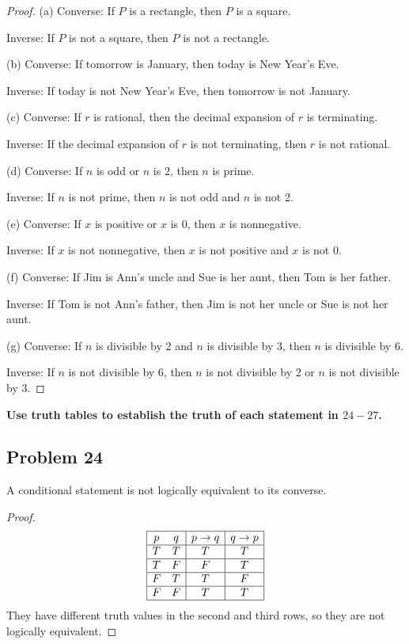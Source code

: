 \documentclass[14pt]{extarticle}
\begin{document}
\begin{proof}
(a) Converse: If $P$ is a rectangle, then $P$ is a square.

Inverse: If $P$ is not a square, then $P$ is not a rectangle.

(b) Converse: If tomorrow is January, then today is New Year’s Eve.

Inverse: If today is not New Year’s Eve, then tomorrow is not January.

(c) Converse: If $r$ is rational, then the decimal expansion of $r$ is terminating.

Inverse: If the decimal expansion of $r$ is not terminating, then $r$ is not rational.

(d) Converse: If $n$ is odd or $n$ is 2, then $n$ is prime.

Inverse: If $n$ is not prime, then $n$ is not odd and $n$ is not 2.	

(e) Converse: If $x$ is positive or $x$ is 0, then $x$ is nonnegative.

Inverse: If $x$ is not nonnegative, then $x$ is not positive and $x$ is not 0.

(f) Converse: If Jim is Ann’s uncle and Sue is her aunt, then Tom is her father.

Inverse: If Tom is not Ann’s father, then Jim is not her uncle or Sue is not her aunt.

(g) Converse: If $n$ is divisible by 2 and $n$ is divisible by 3, then $n$ is divisible by 6.

Inverse: If $n$ is not divisible by 6, then $n$ is not divisible by 2 or $n$ is not divisible by 3.
\end{proof}

{\bf Use truth tables to establish the truth of each statement
in $24-27$.}

\subsection{Problem 24}
A conditional statement is not logically equivalent to its converse.

\begin{proof}
$$
\begin{array}{|cc|c|c|}
\hline
p & q & p \to q & q \to p \\
\hline
T & T & T & T \\
\hline
T & F & F & T \\
\hline
F & T & T & F \\
\hline
F & F & T & T \\
\hline
\end{array}
$$
They have different truth values in the second and third rows, so they are not logically equivalent.
\end{proof}
\end{document}
